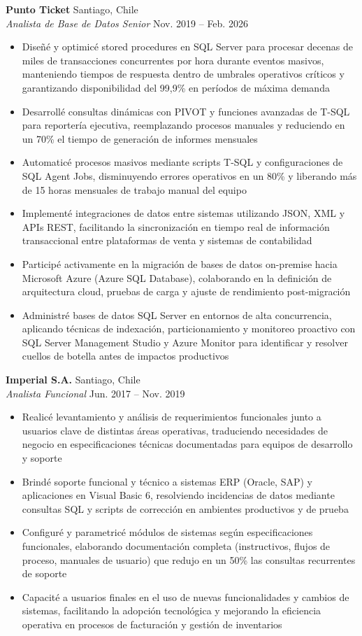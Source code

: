 \documentclass[11pt,letterpaper]{article}
\begin{document}
\textbf{Punto Ticket} \hfill Santiago, Chile\\
\textit{Analista de Base de Datos Senior} \hfill Nov. 2019 – Feb. 2026
\begin{itemize}
  \item Diseñé y optimicé stored procedures en SQL Server para procesar decenas de miles de transacciones concurrentes por hora durante eventos masivos, manteniendo tiempos de respuesta dentro de umbrales operativos críticos y garantizando disponibilidad del 99,9\% en períodos de máxima demanda
  \item Desarrollé consultas dinámicas con PIVOT y funciones avanzadas de T-SQL para reportería ejecutiva, reemplazando procesos manuales y reduciendo en un 70\% el tiempo de generación de informes mensuales
  \item Automaticé procesos masivos mediante scripts T-SQL y configuraciones de SQL Agent Jobs, disminuyendo errores operativos en un 80\% y liberando más de 15 horas mensuales de trabajo manual del equipo
  \item Implementé integraciones de datos entre sistemas utilizando JSON, XML y APIs REST, facilitando la sincronización en tiempo real de información transaccional entre plataformas de venta y sistemas de contabilidad
  \item Participé activamente en la migración de bases de datos on-premise hacia Microsoft Azure (Azure SQL Database), colaborando en la definición de arquitectura cloud, pruebas de carga y ajuste de rendimiento post-migración
  \item Administré bases de datos SQL Server en entornos de alta concurrencia, aplicando técnicas de indexación, particionamiento y monitoreo proactivo con SQL Server Management Studio y Azure Monitor para identificar y resolver cuellos de botella antes de impactos productivos
\end{itemize}
\vspace{2pt}
\textbf{Imperial S.A.} \hfill Santiago, Chile\\
\textit{Analista Funcional} \hfill Jun. 2017 – Nov. 2019
\begin{itemize}
  \item Realicé levantamiento y análisis de requerimientos funcionales junto a usuarios clave de distintas áreas operativas, traduciendo necesidades de negocio en especificaciones técnicas documentadas para equipos de desarrollo y soporte
  \item Brindé soporte funcional y técnico a sistemas ERP (Oracle, SAP) y aplicaciones en Visual Basic 6, resolviendo incidencias de datos mediante consultas SQL y scripts de corrección en ambientes productivos y de prueba
  \item Configuré y parametricé módulos de sistemas según especificaciones funcionales, elaborando documentación completa (instructivos, flujos de proceso, manuales de usuario) que redujo en un 50\% las consultas recurrentes de soporte
  \item Capacité a usuarios finales en el uso de nuevas funcionalidades y cambios de sistemas, facilitando la adopción tecnológica y mejorando la eficiencia operativa en procesos de facturación y gestión de inventarios
\end{itemize}
\end{document}
